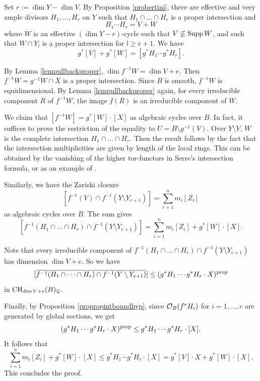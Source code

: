 Set $r:=\dim Y-\dim V.$
By Proposition \ref{probertini},  there are effective and very ample divisors $H_1,\dots, H_r$ on $Y$ such that
$H_1\cap \dots \cap H_r$ is a proper intersection and
$$H_1\cdots H_r=V+W$$
where $W$ is an effective $(\dim Y-r)$-cycle such that
$V\not\subseteq {\rm Supp} \,W$, and such that $W\cap Y_l$ is a proper intersection
for $l\geq e+1$.
We have $$g^*[V]+g^*[W]=[g^*H_1\cdots g^*H_r].$$

By Lemma \ref{lempullbackproper}, $\dim f^{-1}W=\dim V+e.$
Then $f^{-1}W=g^{-1}W \cap X$ is a proper intersection. Since $B$ is smooth, $f^{-1}W$ is equidimensional.
By Lemma \ref{lempullbackproper} again, for every irreducible component $R$ of $f^{-1}W$, the image $f(R)$ is an irreducible component of $W.$

We claim that $[f^{-1}W]=g^*[W]\cdot [X]$ as algebraic cycles over $B$.
In fact, it suffices to prove the restriction of the equality to $U=B\setminus g^{-1}(V)$. Over $Y\setminus V$, $W$ is the complete intersection $H_1\cap \dots \cap H_r$.
Then the result follows by the fact that the intersection multiplicities are given by length of the local rings.
This can be obtained by the vanishing of the higher tor-functors in Serre's intersection formula, or as an example of \cite[Proposition 7.1 (b)]{Fulton1984}.

Similarly, we have the Zariski closure
$$[\overline{f^{-1}(V)\cap f^{-1}(Y\setminus Y_{e+1})}]
=\sum_{i=1}^n m_i[Z_i]$$
as algebraic cycles over $B$.
The sum gives
$$[\overline{f^{-1}(H_1\cap \dots \cap H_r)\cap f^{-1}(Y\setminus Y_{e+1})}]=\sum_{i=1}^n m_i[Z_i]+g^*[W]\cdot [X].$$



Note that every irreducible component of
$f^{-1}(H_1\cap \dots \cap H_r)\cap f^{-1}(Y\setminus Y_{e+1})$ has dimension $\dim V+e.$
So we have
$$[\overline{f^{-1}(H_1\cap \dots \cap H_r)\cap f^{-1}(Y\setminus Y_{e+1})}]\leq (g^*H_1\cdots g^*H_r\cdot X)^{{\rm prop}}$$
in ${\rm CH}_{\dim V+e}(B)_{\mathbb Q}$.

Finally, by Proposition \ref{propropintboundhyp}, since ${\mathcal O}_{B}(f^*H_i)$ for $ i=1,\dots,r$ are generated by global sections,
we get
$$(g^*H_1\cdots g^*H_r\cdot X)^{{\rm prop}}\leq g^*H_1\cdots g^*H_r\cdot [X].$$
It follows that
$$\sum_{i=1}^n m_i[Z_i]+g^*[W]\cdot [X]\leq g^*H_1\cdots g^*H_r\cdot [X]=g^*[V]\cdot X+g^*[W]\cdot [X].$$
This concludes the proof.
\endproof






